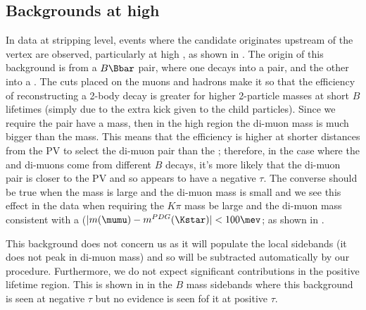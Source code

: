 \subsection{Backgrounds at high \qsq}

In data at stripping level, events where the \db candidate originates upstream of the \Bd vertex are observed,
particularly at high \qsq, as shown in .
The origin of this background is from a $B\Bbar$ pair, where one decays into a \mumu pair, and the
other into a \kpi.
The \chisqip cuts placed on the muons and hadrons make it so that the efficiency of reconstructing a 2-body decay is greater for higher 2-particle masses at short $B$ lifetimes (simply due to the extra kick given to the child particles).
Since we require the \kpi pair have a \Kstar mass, then in the high \qsq region the di-muon mass is much bigger than the \Kstar mass.  This means that the efficiency is higher at shorter distances from the PV to select the di-muon pair than the \Kstar; therefore, in the case where the \Kstar and di-muons come from different $B$ decays, it's more likely that the di-muon pair is closer to the PV and so appears to have a negative $\tau$.
The converse should be true when the \kpi mass is large and the di-muon mass is small and we see this effect in the data when requiring
the $K\pi$  mass be large and the di-muon mass
consistent with a \Kstar ($|m(\mumu)-m^{PDG}(\Kstar)|<100\mev$; as shown in
.

This background does not concern us as it will populate the local sidebands (it does not peak in
di-muon mass) and so will be subtracted automatically by our procedure.  Furthermore, we do not
expect significant contributions in the positive lifetime  region.  This is shown in
 in the $B$ mass sidebands where this background is seen at negative $\tau$ but
no evidence is seen fof it at positive $\tau$.






